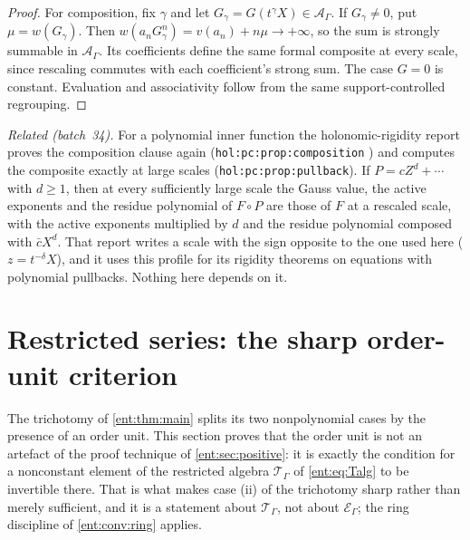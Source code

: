 \documentclass[11pt]{article}
\theoremstyle{plain}
\theoremstyle{plain}
\theoremstyle{plain}
\theoremstyle{definition}
\theoremstyle{definition}
\theoremstyle{definition}
\theoremstyle{definition}
\theoremstyle{remark}
\newcommand{\E}{\mathcal E_\Gamma}
\newcommand{\A}{\mathcal A_\Gamma}\newcommand{\OO}{\mathcal O_\Gamma}
\newcommand{\TT}{\mathcal T_\Gamma}
\begin{document}
\begin{proof}
For composition, fix $\gamma$ and let $G_\gamma=G(t^\gamma X)\in\A$. If
$G_\gamma\ne0$, put $\mu=w(G_\gamma)$. Then
$w(a_nG_\gamma^n)=v(a_n)+n\mu\to+\infty$, so the sum is strongly summable in
$\A$. Its coefficients define the same formal composite at every scale, since
rescaling commutes with each coefficient's strong sum. The case $G=0$ is
constant. Evaluation and associativity follow from the same
support-controlled regrouping.
\end{proof}

\emph{Related (batch~34).} For a polynomial inner function the
holonomic-rigidity report proves the composition clause again
(\texttt{hol:pc:prop:composition} \cite{RepoHolonomic}) and computes the
composite exactly at large scales (\texttt{hol:pc:prop:pullback}). If
$P=cZ^d+\cdots$ with $d\ge1$, then at every sufficiently large scale the
Gauss value, the active exponents and the residue polynomial of $F\circ P$
are those of $F$ at a rescaled scale, with the active exponents multiplied by
$d$ and the residue polynomial composed with $\bar cX^d$. That report writes
a scale with the sign opposite to the one used here ($z=t^{-\delta}X$), and it
uses this profile for its rigidity theorems on equations with polynomial
pullbacks. Nothing here depends on it.

\section{Restricted series: the sharp order-unit criterion}
\label{ent:sec:units}

The trichotomy of \cref{ent:thm:main} splits its two nonpolynomial cases by
the presence of an order unit. This section proves that the order unit is not
an artefact of the proof technique of \cref{ent:sec:positive}: it is exactly
the condition for a nonconstant element of the restricted algebra $\TT$ of
\eqref{ent:eq:Talg} to be invertible there. That is what makes case (ii) of
the trichotomy sharp rather than merely sufficient, and it is a statement
about $\TT$, not about $\E$; the ring discipline of \cref{ent:conv:ring}
applies.
\end{document}
